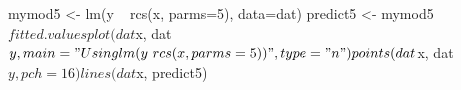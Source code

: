 \begin{Schunk}
\begin{Sinput}
 mymod5 <- lm(y ~ rcs(x, parms=5), data=dat)
 predict5 <- mymod5$fitted.values
 plot(dat$x, dat$y,main="Using lm(y~rcs(x,parms=5))", type="n")
 points(dat$x, dat$y, pch=16)
 lines(dat$x, predict5)
\end{Sinput}
\end{Schunk}
